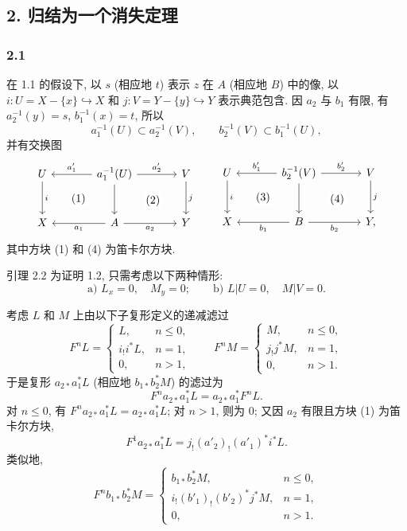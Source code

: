 \subsection*{2. 归结为一个消失定理}

\subsubsection*{2.1}
在 1.1 的假设下, 以 $s$ (相应地 $t$) 表示 $z$ 在 $A$ (相应地 $B$) 中的像, 以 $i:U=X-\{x\}\hookrightarrow X$ 和 $j:V=Y-\{y\}\hookrightarrow Y$ 表示典范包含. 因 $a_2$ 与 $b_1$ 有限, 有 $a_2^{-1}(y)=s$, $b_1^{-1}(x)=t$, 所以
\[
a_1^{-1}(U)\subset a_2^{-1}(V),\qquad b_2^{-1}(V)\subset b_1^{-1}(U),
\]
并有交换图
\[
\begin{tikzcd}[column sep=large,row sep=large]
U \arrow[d,"i"] \arrow[rd,phantom,"(1)"{description}] & a_1^{-1}(U) \arrow[l,"a'_1"'] \arrow[r,"a'_2"] \arrow[d] \arrow[rd,phantom,"(2)"{description}] & V \arrow[d,"j"]\\
X & A \arrow[l,"a_1"] \arrow[r,"a_2"'] & Y
\end{tikzcd}
\qquad
\begin{tikzcd}[column sep=large,row sep=large]
U \arrow[d,"i"] \arrow[rd,phantom,"(3)"{description}] & b_2^{-1}(V) \arrow[l,"b'_1"'] \arrow[r,"b'_2"] \arrow[d] \arrow[rd,phantom,"(4)"{description}] & V \arrow[d,"j"]\\
X & B \arrow[l,"b_1"] \arrow[r,"b_2"'] & Y ,
\end{tikzcd}
\]
其中方块 (1) 和 (4) 为笛卡尔方块.

\begin{statement}{引理 2.2}
为证明 1.2, 只需考虑以下两种情形:
\[
\text{a) } L_x=0,\quad M_y=0;\qquad
\text{b) } L|U=0,\quad M|V=0 .
\]
\end{statement}

考虑 $L$ 和 $M$ 上由以下子复形定义的递减滤过
\[
F^nL=
\begin{cases}
L,& n\le 0,\\
i_!i^*L,& n=1,\\
0,& n>1,
\end{cases}
\qquad
F^nM=
\begin{cases}
M,& n\le 0,\\
j_!j^*M,& n=1,\\
0,& n>1.
\end{cases}
\]
于是复形 $a_{2*}a_1^*L$ (相应地 $b_{1*}b_2^*M$) 的滤过为
\[
F^n a_{2*}a_1^*L=a_{2*}a_1^*F^nL.
\]
对 $n\le0$, 有 $F^n a_{2*}a_1^*L=a_{2*}a_1^*L$; 对 $n>1$, 则为 $0$; 又因 $a_2$ 有限且方块 (1) 为笛卡尔方块,
\[
F^1a_{2*}a_1^*L=j_!(a'_2)_!(a'_1)^*i^*L.
\]
类似地,
\[
F^n b_{1*}b_2^*M=
\begin{cases}
b_{1*}b_2^*M,& n\le 0,\\
i_!(b'_1)_!(b'_2)^*j^*M,& n=1,\\
0,& n>1.
\end{cases}
\]

